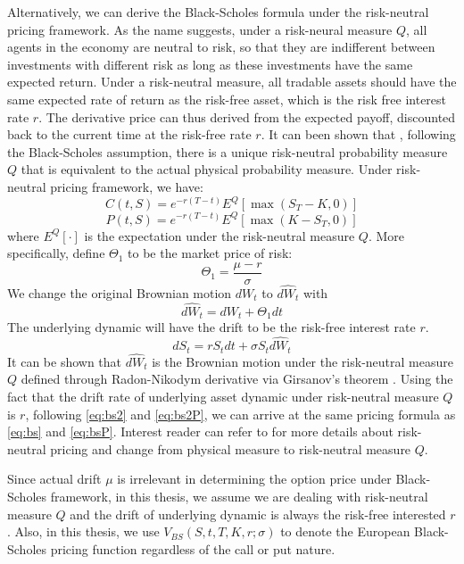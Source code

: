 \documentclass[letterpaper,12pt,titlepage,oneside,final]{book}
\numberwithin{equation}{section}
\theoremstyle{definition}
\begin{document}
Alternatively, we can derive the Black-Scholes formula under the risk-neutral pricing framework. As the name suggests, under a risk-neural measure $Q$, all agents in the economy are neutral to risk, so that they are indifferent between investments with different risk as long as these investments have the same expected return. Under a risk-neutral measure, all tradable assets should have the same expected rate of return as the risk-free asset, which is the risk free interest rate $r$. The derivative price can thus derived from the expected payoff, discounted back to the current time at the risk-free rate $r$. It can been shown that \cite{shreve2004stochastic}, following the Black-Scholes assumption, there is a unique risk-neutral probability measure $Q$ that is equivalent to the actual physical probability measure. Under risk-neutral pricing framework, we have:
\begin{equation}
C(t,S)=e^{-r(T-t)} E^Q[\max(S_T-K,0)]
\label{eq:bs2}
\end{equation}
\begin{equation}
P(t,S)=e^{-r(T-t)} E^Q[\max(K-S_T,0)]
\label{eq:bs2P}
\end{equation}
where $E^Q[\cdot]$ is the expectation under the risk-neutral measure $Q$.
More specifically, define $\Theta_1$ to be the market price of risk:
\begin{equation}
\Theta_1=\frac{\mu-r}{\sigma}
\label{eq:price-risk}
\end{equation}
We change the original Brownian motion $dW_t$ to $\hat{dW_t}$ with
\begin{equation}
\hat{dW_t}=dW_t+\Theta_1 dt
\label{eq:riskS}
\end{equation}
The underlying dynamic will have the drift to be the risk-free interest rate $r$.
\[
dS_t=r S_t dt+\sigma S_t \hat{dW_t}
\]
It can be shown that $\hat{dW_t}$ is the Brownian motion under the risk-neutral measure $Q$ defined through Radon-Nikodym derivative via Girsanov's theorem \cite{shreve2004stochastic}. Using the fact that the drift rate of underlying asset dynamic under risk-neutral measure $Q$ is $r$, following \eqref{eq:bs2} and \eqref{eq:bs2P}, we can arrive at the same pricing formula as \eqref{eq:bs} and \eqref{eq:bsP}. Interest reader can refer to \cite{shreve2004stochastic} for more details about risk-neutral pricing and change from physical measure to risk-neutral measure $Q$.

Since actual drift $\mu$ is irrelevant in determining the option price under Black-Scholes framework, in this thesis, we assume we are dealing with risk-neutral measure $Q$ and the drift of underlying dynamic is always the risk-free interested $r$. Also, in this thesis, we use $V_{BS}(S,t,T,K,r;\sigma)$ to denote the European Black-Scholes pricing function regardless of the call or put nature.
\end{document}
